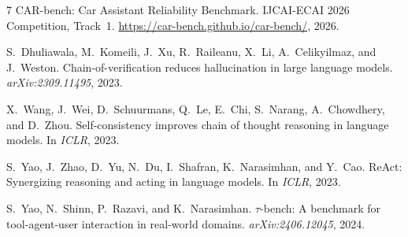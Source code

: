 \documentclass{article}
\begin{document}
\begin{thebibliography}{7}
\scriptsize
{}
CAR-bench: Car Assistant Reliability Benchmark. IJCAI-ECAI 2026 Competition,
Track~1. \url{https://car-bench.github.io/car-bench/}, 2026.

S.~Dhuliawala, M.~Komeili, J.~Xu, R.~Raileanu, X.~Li, A.~Celikyilmaz, and
J.~Weston. Chain-of-verification reduces hallucination in large language
models. \emph{arXiv:2309.11495}, 2023.

X.~Wang, J.~Wei, D.~Schuurmans, Q.~Le, E.~Chi, S.~Narang, A.~Chowdhery, and
D.~Zhou. Self-consistency improves chain of thought reasoning in language
models. In \emph{ICLR}, 2023.

S.~Yao, J.~Zhao, D.~Yu, N.~Du, I.~Shafran, K.~Narasimhan, and Y.~Cao. ReAct:
Synergizing reasoning and acting in language models. In \emph{ICLR}, 2023.

S.~Yao, N.~Shinn, P.~Razavi, and K.~Narasimhan. $\tau$-bench: A benchmark for
tool-agent-user interaction in real-world domains. \emph{arXiv:2406.12045},
2024.
\end{thebibliography}
\end{document}
